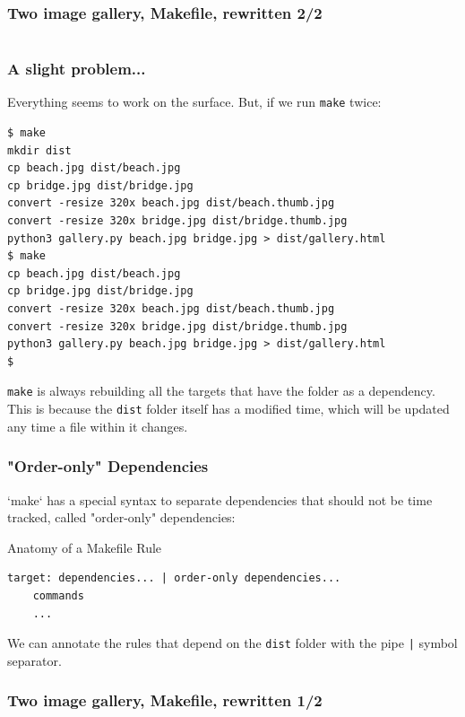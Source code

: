 \documentclass[xcolor=dvipsnames,t,compress]{beamer}
\begin{document}
\begin{frame}[fragile]
\frametitle{Two image gallery, Makefile, rewritten 2/2}
\vspace{-1em}
\inputminted[fontsize=\small,frame=single,tabsize=4,firstline=13,lastline=24]{make}{examples/make/Makefile.10}
\end{frame}

\begin{frame}[fragile]
\frametitle{A slight problem...}
\vspace{-1em}
Everything seems to work on the surface. But, if we run \texttt{make} twice:

\begin{verbatim}
$ make
mkdir dist
cp beach.jpg dist/beach.jpg
cp bridge.jpg dist/bridge.jpg
convert -resize 320x beach.jpg dist/beach.thumb.jpg
convert -resize 320x bridge.jpg dist/bridge.thumb.jpg
python3 gallery.py beach.jpg bridge.jpg > dist/gallery.html
$ make
cp beach.jpg dist/beach.jpg
cp bridge.jpg dist/bridge.jpg
convert -resize 320x beach.jpg dist/beach.thumb.jpg
convert -resize 320x bridge.jpg dist/bridge.thumb.jpg
python3 gallery.py beach.jpg bridge.jpg > dist/gallery.html
$
\end{verbatim}
\texttt{make} is always rebuilding all the targets that have the folder as a dependency.
\pause
\\
This is because the \texttt{dist} folder itself has a modified time, which will be updated any time a file within it changes.
\end{frame}

\begin{frame}[fragile]
\frametitle{"Order-only" Dependencies}
`make` has a special syntax to separate dependencies that should not be time tracked, called "order-only" dependencies:
\begin{block}{Anatomy of a Makefile Rule}
\begin{verbatim}
target: dependencies... | order-only dependencies...
	commands
	...
\end{verbatim}
\end{block}
\vspace{1em}
We can annotate the rules that depend on the \texttt{dist} folder with the pipe \texttt{|} symbol separator.
\end{frame}

\begin{frame}[fragile]
\frametitle{Two image gallery, Makefile, rewritten 1/2}
\vspace{-1em}
\inputminted[fontsize=\small,frame=single,tabsize=4,firstline=1,lastline=12]{make}{examples/make/Makefile.11}
\end{frame}
\end{document}
